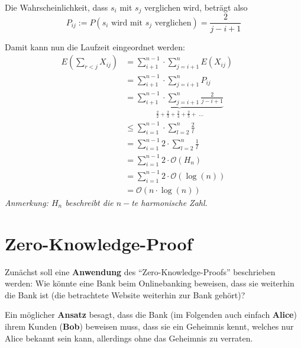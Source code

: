 \documentclass{scrartcl}%
\begin{document}
    Die Wahrscheinlichkeit, dass $s_i$ mit $s_j$ verglichen wird, beträgt also
    \begin{equation*}
        P_{ij}:= P(s_i \text{ wird mit } s_j \text{ verglichen}) = \frac{2}{j-i+1}
    \end{equation*}

    Damit kann nun die Laufzeit eingeordnet werden:
    \begin{equation*}
        \begin{flalign}
            E\left(\sum_{r<j}X_{ij}\right)  &= \sum_{i+1}^{n-1} \cdot \sum_{j=i+1}^{n}E(X_{ij})&&\\\nonumber
                                            &= \sum_{i+1}^{n-1} \cdot \sum_{j=i+1}^{n}P_{ij}&&\\\nonumber
                                            &= \underbrace{\sum_{i+1}^{n-1} \cdot \sum_{j=i+1}^{n}\frac{2}{j-i+1}}_{\frac{2}{2}+\frac{2}{3}+\frac{2}{4}+\frac{2}{5}+\ ...}&&\\\nonumber
                                            &\leq \sum_{i=1}^{n-1} \cdot \sum_{l=2}^{n}\frac{2}{l}&&\\\nonumber
                                            &= \sum_{i=1}^{n-1}2 \cdot \sum_{l=2}^{n} \frac{1}{l}&&\\\nonumber
                                            &= \sum_{i=1}^{n-1}2 \cdot \mathcal{O}(H_n)&&\\\nonumber
                                            &= \sum_{i=1}^{n-1}2 \cdot \mathcal{O}(\log(n))&&\\\nonumber
                                            &= \mathcal{O}(n \cdot \log(n))
        \end{flalign}
    \end{equation*}
    \textit{Anmerkung: $H_n$ beschreibt die $n-$te harmonische Zahl.}

    \section*{Zero-Knowledge-Proof}
    \label{sec:zero-knowledge-proof}
    Zunächst soll eine \textbf{\textsf{Anwendung}} des "`Zero-Knowledge-Proofs"' beschrieben werden:
    Wie könnte eine Bank beim Onlinebanking beweisen, dass sie weiterhin die Bank ist (die betrachtete Website weiterhin zur Bank gehört)?

    Ein möglicher \textbf{\textsf{Ansatz}} besagt, dass die Bank (im Folgenden auch einfach \textbf{\textsf{Alice}})
    ihrem Kunden (\textbf{\textsf{Bob}}) beweisen muss, dass sie ein Geheimnis kennt, welches nur Alice bekannt sein kann,
    allerdings ohne das Geheimnis zu verraten.
\end{document}
